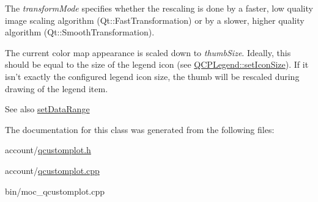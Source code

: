 \-The {\itshape transform\-Mode\/} specifies whether the rescaling is done by a faster, low quality image scaling algorithm (\-Qt\-::\-Fast\-Transformation) or by a slower, higher quality algorithm (\-Qt\-::\-Smooth\-Transformation).

\-The current color map appearance is scaled down to {\itshape thumb\-Size\/}. \-Ideally, this should be equal to the size of the legend icon (see \hyperlink{classQCPLegend_a8b0740cce488bf7010da6beda6898984}{\-Q\-C\-P\-Legend\-::set\-Icon\-Size}). \-If it isn't exactly the configured legend icon size, the thumb will be rescaled during drawing of the legend item.

\begin{DoxySeeAlso}{\-See also}
\hyperlink{classQCPColorMap_a980b42837821159786a85b4b7dcb8774}{set\-Data\-Range} 
\end{DoxySeeAlso}


\-The documentation for this class was generated from the following files\-:\begin{DoxyCompactItemize}
\item 
account/\hyperlink{qcustomplot_8h}{qcustomplot.\-h}\item 
account/\hyperlink{qcustomplot_8cpp}{qcustomplot.\-cpp}\item 
bin/moc\-\_\-qcustomplot.\-cpp\end{DoxyCompactItemize}
